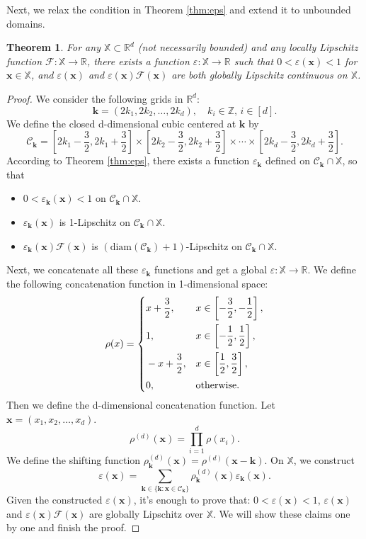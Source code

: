 \documentclass{amsart} %
\def\vk{{\bm{k}}}
\def\vx{{\bm{x}}}
\def\sR{{\mathbb{R}}}
\def\sX{{\mathbb{X}}}
\def\sZ{{\mathbb{Z}}}
\def\cC{{\mathcal{C}}}
\def\cF{{\mathcal{F}}}
\newtheorem{theorem}{Theorem}[section]
\theoremstyle{definition}
\theoremstyle{remark}
\begin{document}
Next, we relax the condition in Theorem \ref{thm:eps} and extend it to unbounded domains.
\begin{theorem}
\label{thm:eps-unbdd}
For any $\sX\subset \sR^d$ (not necessarily bounded) and any locally Lipschitz function $\cF:\sX\to \sR$, there exists a function $\varepsilon: \sX\to\sR$ such that $0 < \varepsilon(\vx) < 1$ for $\vx \in \sX$, and $\varepsilon(\vx)$ and $\varepsilon(\vx) \cF(\vx)$ are both globally Lipschitz continuous on $\sX$.
\end{theorem}
\begin{proof}
We consider the following grids in $\sR^d$: 
$$
\vk = (2k_1,2k_2,\ldots,2k_d),\quad k_i\in \sZ, \, i\in [d].
$$
We define the closed d-dimensional cubic centered at $\vk$ by
$$
\cC_\vk =\left[ 2k_1-\frac{3}{2}, 2k_1+\frac{3}{2}  \right]\times\left[ 2k_2-\frac{3}{2}, 2k_2+\frac{3}{2}  \right]\times \cdots \times \left[ 2k_d-\frac{3}{2}, 2k_d+\frac{3}{2}  \right].
$$
According to Theorem \ref{thm:eps}, there exists a function $\varepsilon_\vk$ defined on $\cC_\vk\cap \sX$, so that 
\begin{itemize}[leftmargin=5mm]
    \item $0<\varepsilon_\vk(\vx)<1$ on $\cC_\vk\cap \sX$.
    \item $\varepsilon_\vk(\vx)$ is 1-Lipschitz on $\cC_\vk\cap \sX$.
    \item $\varepsilon_\vk(\vx)\cF(\vx)$ is $\left(\mathrm{diam}(\cC_\vk) + 1\right)$-Lipschitz on $\cC_\vk\cap \sX$.
\end{itemize}
Next, we concatenate all these $\varepsilon_\vk$ functions and get a global $\varepsilon:\sX\to\sR$. We define the following concatenation function in 1-dimensional space:
\begin{equation*}
\rho(x) = \left\{
\begin{aligned}
    & x + \frac{3}{2},  \quad &&  x\in\left[ -\frac{3}{2},-\frac{1}{2} \right], \\
& 1,  && x\in\left[ -\frac{1}{2},\frac{1}{2} \right],\\
& -x+\frac{3}{2}, && x\in\left[ \frac{1}{2},\frac{3}{2} \right],\\
& 0, && \textup{otherwise}.
\end{aligned}\right.
\end{equation*}
Then we define the d-dimensional concatenation function. Let $\vx=(x_1, x_2,\ldots, x_d)$.
$$
\rho^{(d)}(\vx) = \prod_{i=1}^d \rho(x_i).
$$
We define the shifting function $\rho^{(d)}_\vk(\vx)=\rho^{(d)}(\vx-\vk)$. On $\sX$, we construct
$$
\varepsilon(\vx) = \sum_{\vk\in\{\vk:\vx\in\cC_\vk\}} \rho^{(d)}_\vk(\vx)\varepsilon_\vk(\vx).
$$
Given the constructed $\varepsilon(\vx)$, it's enough to prove that: $0<\varepsilon(\vx)<1$, $\varepsilon(\vx)$ and $\varepsilon(\vx)\cF(\vx)$ are globally Lipschitz over $\sX$. We will show these claims one by one and finish the proof.


\end{proof}
\end{document}
